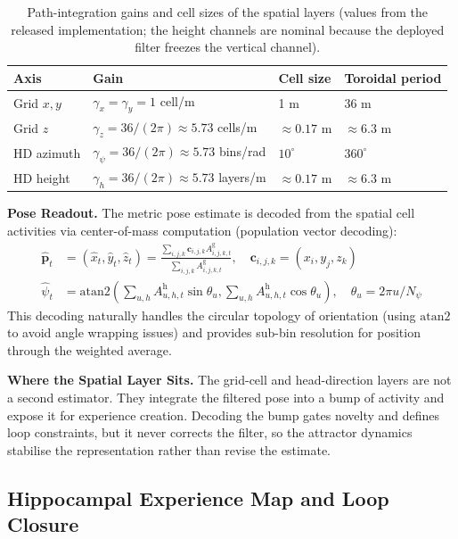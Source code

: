 \begin{table}[!htbp]
    \centering
    \caption{Path-integration gains and cell sizes of the spatial layers (values from the released implementation; the height channels are nominal because the deployed filter freezes the vertical channel).}
    \label{tab:gains}
    \footnotesize
    \begin{tabular}{@{}llll@{}}
        \toprule
        Axis & Gain & Cell size & Toroidal period \\
        \midrule
        Grid $x,y$ & $\gamma_x=\gamma_y=1$ cell/m & 1 m & 36 m \\
        Grid $z$ & $\gamma_z=36/(2\pi)\approx5.73$ cells/m & $\approx0.17$ m & $\approx6.3$ m \\
        HD azimuth & $\gamma_\psi=36/(2\pi)\approx5.73$ bins/rad & $10^{\circ}$ & $360^{\circ}$ \\
        HD height & $\gamma_h=36/(2\pi)\approx5.73$ layers/m & $\approx0.17$ m & $\approx6.3$ m \\
        \bottomrule
    \end{tabular}
\end{table}
\textbf{Pose Readout.} The metric pose estimate is decoded from the spatial cell activities via center-of-mass computation (population vector decoding):
\begin{align}
    \hat{\mathbf{p}}_t & = ({\hat x}_t, {\hat y}_t, {\hat z}_t) = \frac{\sum_{i,j,k} \mathbf{c}_{i,j,k} A^\mathrm{g}_{i,j,k,t}}{\sum_{i,j,k} A^\mathrm{g}_{i,j,k,t}}, \quad \mathbf{c}_{i,j,k} = (x_i, y_j, z_k) \\
    \hat{\psi}_t       & = \mathrm{\mathrm{atan2}}\left(\sum_{u,h} A^\mathrm{h}_{u,h,t} \sin\theta_u, \sum_{u,h} A^\mathrm{h}_{u,h,t} \cos\theta_u\right), \quad \theta_u = 2\pi u / N_\psi
\end{align}
This decoding naturally handles the circular topology of orientation (using $\mathrm{\mathrm{atan2}}$ to avoid angle wrapping issues) and provides sub-bin resolution for position through the weighted average.

\textbf{Where the Spatial Layer Sits.} The grid-cell and head-direction layers are not a second estimator. They integrate the filtered pose into a bump of activity and expose it for experience creation. Decoding the bump gates novelty and defines loop constraints, but it never corrects the filter, so the attractor dynamics stabilise the representation rather than revise the estimate.

\subsection{Hippocampal Experience Map and Loop Closure}
\label{sec:loop_closure}

